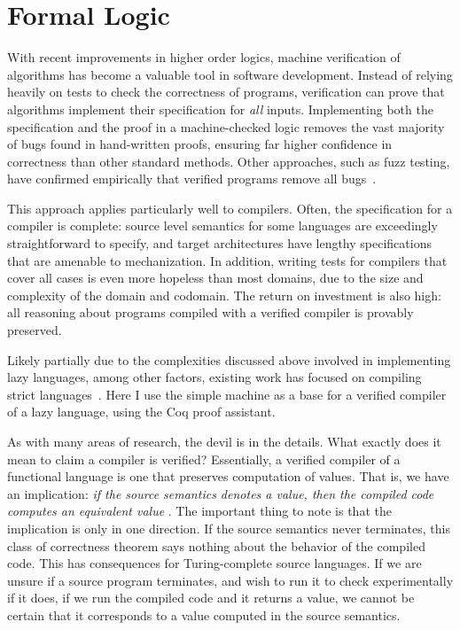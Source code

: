 \section{Formal Logic} \label{sec:background}

With recent improvements in higher order logics, machine verification of
algorithms has become a valuable tool in software development. Instead of
relying heavily on tests to check the correctness of programs, verification can
prove that algorithms implement their specification for \emph{all} inputs.
Implementing both the specification and the proof in a machine-checked logic
removes the vast majority of bugs found in hand-written proofs, ensuring far
higher confidence in correctness than other standard methods. Other approaches,
such as fuzz testing, have confirmed empirically that verified programs remove
all bugs~\cite{yangfuzz}.

This approach applies particularly well to compilers. Often, the specification
for a compiler is complete: source level semantics for some languages are
exceedingly straightforward to specify, and target architectures have lengthy
specifications that are amenable to mechanization. In addition, writing tests
for compilers that cover all cases is even more hopeless than most domains, due
to the size and complexity of the domain and codomain. The return on investment
is also high: all reasoning about programs compiled with a verified compiler is
provably preserved. 

Likely partially due to the complexities discussed above involved in
implementing lazy languages, among other factors, existing work has focused on
compiling strict languages~\cite{chlipala2007certified, leroy2012compcert,
cakeml14}. Here I use the simple \ce machine as a base for a verified compiler
of a lazy language, using the Coq proof assistant. 

As with many areas of research, the devil is in the details. What exactly does
it mean to claim a compiler is verified?  Essentially, a verified compiler of a
functional language is one that preserves computation of values. That is, we
have an implication: \emph{if the source semantics denotes a value, then the
compiled code computes an equivalent value} \cite{chlipala2007certified}. The
important thing to note is that the implication is only in one direction. If the
source semantics never terminates, this class of correctness theorem says
nothing about the behavior of the compiled code. This has consequences for
Turing-complete source languages. If we are unsure if a source program
terminates, and wish to run it to check experimentally if it does, if we run the
compiled code and it returns a value, we cannot be certain that it corresponds
to a value computed in the source semantics. 

